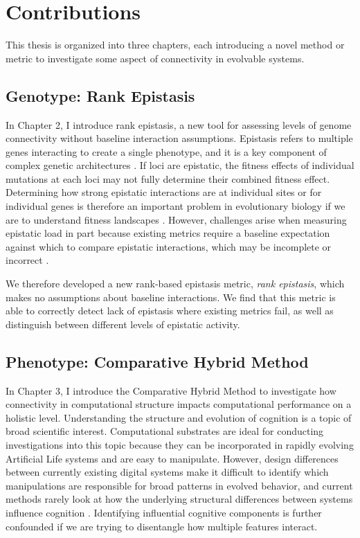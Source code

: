 \section{Contributions}

This thesis is organized into three chapters, each introducing a novel method or metric to investigate some aspect of connectivity in evolvable systems. 

\subsection{Genotype: Rank Epistasis}

In Chapter 2, I introduce rank epistasis, a new tool for assessing levels of genome connectivity without baseline interaction assumptions. 
Epistasis refers to multiple genes interacting to create a single phenotype, and it is a key component of complex genetic architectures \citep{khan_negative_2011, weinreich_should_2013, wiser_long-term_2013, gupta_shared_2016, payne_causes_2019}. 
If loci are epistatic, the fitness effects of individual mutations at each loci may not fully determine their combined fitness effect. 
Determining how strong epistatic interactions are at individual sites or for individual genes is therefore an important problem in evolutionary biology if we are to understand fitness landscapes \citep{cordell_epistasis_2002, weinreich_should_2013}. 
However, challenges arise when measuring epistatic load in part because existing metrics require a baseline expectation against which to compare epistatic interactions, which may be incomplete or incorrect \citep{puniyani_meaning_2004}.

We therefore developed a new rank-based epistasis metric, \textit{rank epistasis}, which makes no assumptions about baseline interactions.
We find that this metric is able to correctly detect lack of epistasis where existing metrics fail, as well as distinguish between different levels of epistatic activity.

\subsection{Phenotype: Comparative Hybrid Method}

In Chapter 3, I introduce the Comparative Hybrid Method to investigate how connectivity in computational structure impacts computational performance on a holistic level. 
Understanding the structure and evolution of cognition is a topic of broad scientific interest. 
Computational substrates are ideal for conducting investigations into this topic because they can be incorporated in rapidly evolving Artificial Life systems and are easy to manipulate.
However, design differences between currently existing digital systems make it difficult to identify which manipulations are responsible for broad patterns in evolved behavior, and current methods rarely look at how the underlying structural differences between systems influence cognition \citep{hintze_evolutionary_2019, real_automl-zero_2020}. 
Identifying influential cognitive components is further confounded if we are trying to disentangle how multiple features interact.

